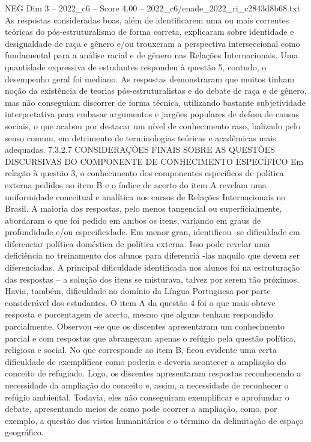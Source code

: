 \begin{textsample}{NEG Dim 3 – 2022\_c6 – Score 4.00 – 2022\_c6/enade\_2022\_ri\_c2843d8b68.txt}
As respostas consideradas boas, além de identificarem uma ou mais correntes teóricas do pós-estruturalismo de forma correta, explicaram sobre identidade e desigualdade de raça e gênero e/ou trouxeram a perspectiva interseccional como fundamental para a análise racial e de gênero nas Relações Internacionais.
Uma quantidade expressiva de estudantes respondeu à questão 5, contudo, o desempenho geral foi mediano.
As respostas demonstraram que muitos tinham noção da existência de teorias pós-estruturalistas e do debate de raça e de gênero, mas não conseguiam discorrer de forma técnica, utilizando bastante subjetividade interpretativa para embasar argumentos e jargões populares de defesa de causas sociais, o que acabou por destacar um nível de conhecimento raso, balizado pelo senso comum, em detrimento de terminologias teóricas e acadêmicas mais adequadas. 7.3.2.7 CONSIDERAÇÕES FINAIS SOBRE AS QUESTÕES DISCURSIVAS DO COMPONENTE DE CONHECIMENTO ESPECÍFICO Em relação à questão 3, o conhecimento dos componentes específicos de política externa pedidos no item B e o índice de acerto do item A revelam uma uniformidade conceitual e analítica nos cursos de Relações Internacionais no Brasil.
A maioria das respostas, pelo menos tangencial ou superficialmente, abordaram o que foi pedido em ambos os itens, variando em graus de profundidade e/ou especificidade.
Em menor grau, identificou -se dificuldade em diferenciar política doméstica de política externa.
Isso pode revelar uma deficiência no treinamento dos alunos para diferenciá -las naquilo que devem ser diferenciadas.
A principal dificuldade identificada nos alunos foi na estruturação das respostas – a solução dos itens se misturava, talvez por serem tão próximos.
Havia, também, dificuldade no domínio da Língua Portuguesa por parte considerável dos estudantes.
O item A da questão 4 foi o que mais obteve resposta e porcentagem de acerto, mesmo que alguns tenham respondido parcialmente.
Observou -se que os discentes apresentaram um conhecimento parcial e com respostas que abrangeram apenas o refúgio pela questão política, religiosa e social.
No que corresponde ao item B, ficou evidente uma certa dificuldade de exemplificar como poderia e deveria acontecer a ampliação do conceito de refugiado.
Logo, os discentes apresentaram respostas reconhecendo a necessidade da ampliação do conceito e, assim, a necessidade de reconhecer o refúgio ambiental.
Todavia, eles não conseguiram exemplificar e aprofundar o debate, apresentando meios de como pode ocorrer a ampliação, como, por exemplo, a questão dos vistos humanitários e o término da delimitação de espaço geográfico.

\end{textsample}
